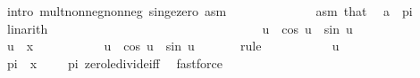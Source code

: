 \begin{isabellebody}
\ {\isacharparenleft}{\kern0pt}intro\ mult{\isacharunderscore}{\kern0pt}nonneg{\isacharunderscore}{\kern0pt}nonneg\ sin{\isacharunderscore}{\kern0pt}ge{\isacharunderscore}{\kern0pt}zero\ asm{\isacharparenleft}{\kern0pt}{}{\isacharparenright}{\kern0pt}{\isacharparenright}{\kern0pt}\isanewline
\ \ \ \ \ \ \ \ \ \ \ \ \isamarkupfalse%
\ asm{\isacharparenleft}{\kern0pt}{}{\isacharparenright}{\kern0pt}\ that{\isacharparenleft}{\kern0pt}{}{\isacharparenright}{\kern0pt}\ \isamarkupfalse%
\ {\isachardoublequoteopen}a\ {\isasymle}\ pi{\isachardoublequoteclose}\ \isamarkupfalse%
\ linarith\isanewline
\ \ \ \ \ \ \ \ \ \ \isamarkupfalse%
\isanewline
\ \ \ \ \ \ \ \ \isamarkupfalse%
\isanewline
\ \ \ \ \ \ \ \ \isamarkupfalse%
\ \isamarkupfalse%
\ {\isachardoublequoteopen}{}\ {\isasymle}\ {\isacharminus}{\kern0pt}\ u\ {\isacharasterisk}{\kern0pt}\ cos\ u\ {\isacharplus}{\kern0pt}\ sin\ u{\isachardoublequoteclose}\ \isakeywordONE{{\isachardot}{\kern0pt}}\isamarkupfalse%
\isanewline
\ \ \ \ \ \ \isamarkupfalse%
\isanewline
\ \ \ \ \ \ \isamarkupfalse%
\ {\isacharquery}{\kern0pt}u\ {\isacharequal}{\kern0pt}\ {\isachardoublequoteopen}{}{\isacharslash}{\kern0pt}x{\isachardoublequoteclose}\isanewline
\ \ \ \ \ \ \isamarkupfalse%
\ {\isachardoublequoteopen}{}\ {\isasymle}\ {\isacharminus}{\kern0pt}\ {\isacharquery}{\kern0pt}u\ {\isacharasterisk}{\kern0pt}\ cos\ {\isacharquery}{\kern0pt}u\ {\isacharplus}{\kern0pt}\ sin\ {\isacharquery}{\kern0pt}u{\isachardoublequoteclose}\isanewline
\ \ \ \ \ \ \isamarkupfalse%
{\isacharparenleft}{\kern0pt}rule\ {\isacharasterisk}{\kern0pt}{\isacharparenright}{\kern0pt}\isanewline
\ \ \ \ \ \ \ \ \isamarkupfalse%
\ {\isachardoublequoteopen}{\isacharquery}{\kern0pt}u\ {\isasymge}\ {}{\isachardoublequoteclose}\isanewline
\ \ \ \ \ \ \ \ \ \ \isamarkupfalse%
\ {\isacartoucheopen}{}{\isacharslash}{\kern0pt}pi\ {\isasymle}\ x{\isacartoucheclose}\ {\isacartoucheopen}{}\ {\isacharless}{\kern0pt}\ {}\ {\isacharslash}{\kern0pt}\ pi{\isacartoucheclose}\ zero{\isacharunderscore}{\kern0pt}le{\isacharunderscore}{\kern0pt}divide{\isacharunderscore}{\kern0pt}{}{\isacharunderscore}{\kern0pt}iff\ \isamarkupfalse%
\ fastforce\isanewline
\ \ \ \ \ \ \ \ \isamarkupfalse%

\end{isabellebody}
